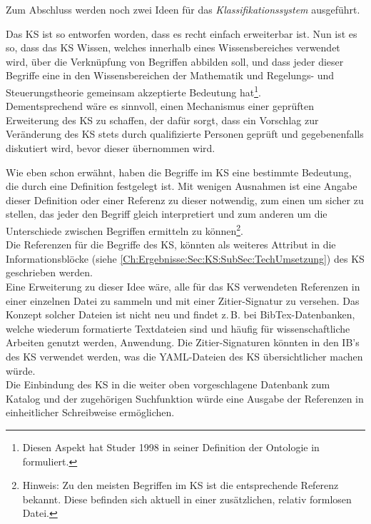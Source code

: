 Zum Abschluss werden noch zwei Ideen für das \textit{Klassifikationssystem} ausgeführt.

Das KS ist so entworfen worden, dass es recht einfach erweiterbar ist. Nun ist es so, dass das KS Wissen, welches innerhalb eines Wissensbereiches verwendet wird, über die Verknüpfung von Begriffen abbilden soll, und dass jeder dieser Begriffe eine in den Wissensbereichen der Mathematik und Regelungs- und Steuerungstheorie gemeinsam akzeptierte Bedeutung hat\footnote{Diesen Aspekt hat Studer 1998 in seiner Definition der Ontologie in \cite[Abschnitt 6.1]{STBEFE98} formuliert.}.\\
Dementsprechend wäre es sinnvoll, einen Mechanismus einer geprüften Erweiterung des KS zu schaffen, der dafür sorgt, dass ein Vorschlag zur Veränderung des KS stets durch qualifizierte Personen geprüft und gegebenenfalls diskutiert wird, bevor dieser übernommen wird.

Wie eben schon erwähnt, haben die Begriffe im KS eine bestimmte Bedeutung, die durch eine Definition festgelegt ist. Mit wenigen Ausnahmen ist eine Angabe dieser Definition oder einer Referenz zu dieser notwendig, zum einen um sicher zu stellen, das jeder den Begriff gleich interpretiert und zum anderen um die Unterschiede zwischen Begriffen ermitteln zu können\footnote{Hinweis: Zu den meisten Begriffen im KS ist die entsprechende Referenz bekannt. Diese befinden sich aktuell in einer zusätzlichen, relativ formlosen Datei.}.\\
Die Referenzen für die Begriffe des KS, könnten als weiteres Attribut in die Informationsblöcke (siehe \autoref{Ch:Ergebnisse:Sec:KS:SubSec:TechUmsetzung}) des KS geschrieben werden.\\
Eine Erweiterung zu dieser Idee wäre, alle für das KS verwendeten Referenzen in einer einzelnen Datei zu sammeln und mit einer Zitier-Signatur zu versehen. Das Konzept solcher Dateien ist nicht neu und findet z.\,B. bei BibTex-Datenbanken, welche wiederum formatierte Textdateien sind und häufig für wissenschaftliche Arbeiten genutzt werden, Anwendung. Die Zitier-Signaturen könnten in den IB's des KS verwendet werden, was die YAML-Dateien des KS übersichtlicher machen würde. \\
Die Einbindung des KS in die weiter oben vorgeschlagene Datenbank zum Katalog und der zugehörigen Suchfunktion würde eine Ausgabe der Referenzen in einheitlicher Schreibweise ermöglichen.


